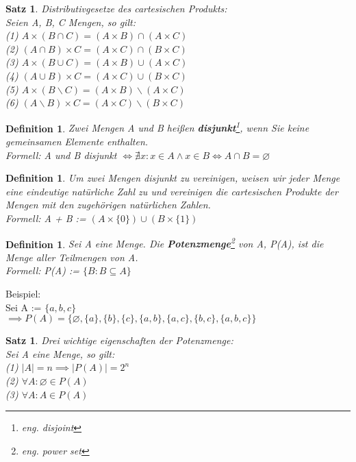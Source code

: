 \documentclass[12pt,german,a4]{article}
\begin{document}
\newtheorem{satz5}[satz]{Satz}
\begin{satz5}
Distributivgesetze des cartesischen Produkts:\\
Seien A, B, C Mengen, so gilt:\\
(1) $A \times (B \cap C) = (A \times B) \cap (A \times C)$\\
(2) $(A \cap B) \times C = (A \times C) \cap (B \times C)$\\
(3) $A \times (B \cup C) = (A \times B) \cup (A \times C)$\\
(4) $(A \cup B) \times C = (A \times C) \cup (B \times C)$\\
(5) $A \times (B \backslash C) = (A \times B) \backslash (A \times C)$\\
(6) $(A \backslash B) \times C = (A \times C) \backslash (B \times C)$
\end{satz5}

\newtheorem{defDisjoint}[defSet]{Definition}
\begin{defDisjoint}
Zwei Mengen A und B heißen {\bf disjunkt}\footnote{eng. disjoint}, wenn Sie keine gemeinsamen Elemente enthalten.\\
Formell: A und B disjunkt $\Leftrightarrow \nexists x: x \in A \wedge x \in B \Leftrightarrow A \cap B = \varnothing$
\end{defDisjoint}

\pagebreak

\newtheorem{defDisjointUnion}[defSet]{Definition}
\begin{defDisjointUnion}
Um zwei Mengen disjunkt zu vereinigen, weisen wir jeder Menge eine eindeutige natürliche Zahl zu und vereinigen die cartesischen Produkte der Mengen mit den zugehörigen natürlichen Zahlen.\\
Formell: A + B := $(A \times \{0\}) \cup (B \times \{1\})$\\
\end{defDisjointUnion}

\newtheorem{defPowerSet}[defSet]{Definition}
\begin{defPowerSet}
Sei A eine Menge. Die {\bf Potenzmenge}\footnote{eng. power set} von A, P(A), ist die Menge aller Teilmengen von A.\\
Formell: P(A) := $\{B: B \subseteq A\}$
\end{defPowerSet}

Beispiel:\\
Sei A := $\{a, b, c\}$\\
$\implies P(A) = \{\varnothing, \{a\}, \{b\}, \{c\}, \{a, b\}, \{a, c\}, \{b, c\}, \{a, b, c\}\}$

\newtheorem{satz6}[satz]{Satz}
\begin{satz6}
Drei wichtige eigenschaften der Potenzmenge:\\
Sei A eine Menge, so gilt:\\
(1) $|A| = n \implies |P(A)| = 2^{n}$\\
(2) $\forall A: \varnothing \in P(A)$\\
(3) $\forall A: A \in P(A)$
\end{satz6}

\pagebreak
\end{document}
